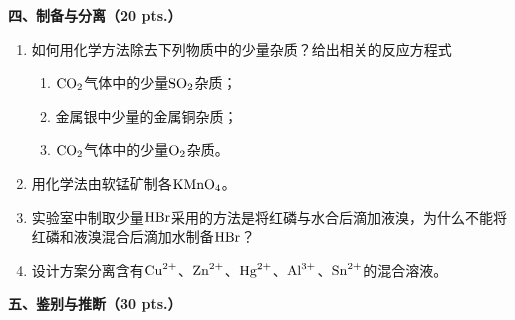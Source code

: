 \vspace{0.5cm}
\noindent\textbf{四、制备与分离（20 pts.）}

\begin{enumerate}[label=\arabic*., start=1, itemsep=1.5ex]
    \item 如何用化学方法除去下列物质中的少量杂质？给出相关的反应方程式
    \begin{enumerate}[label=(\arabic*), itemsep=1ex]
        \item $\ce{CO2}$气体中的少量$\ce{SO2}$杂质；
        \item 金属银中少量的金属铜杂质；
        \item $\ce{CO2}$气体中的少量$\ce{O2}$杂质。
    \end{enumerate}
    \item 用化学法由软锰矿制各$\ce{KMnO4}$。
    \item 实验室中制取少量$\ce{HBr}$采用的方法是将红磷与水合后滴加液溴，为什么不能将红磷和液溴混合后滴加水制备$\ce{HBr}$？
    \item 设计方案分离含有$\ce{Cu^{2+}}$、$\ce{Zn^{2+}}$、$\ce{Hg^{2+}}$、$\ce{Al^3+}$、$\ce{Sn^{2+}}$的混合溶液。
\end{enumerate}

\vspace{0.5cm}
\noindent\textbf{五、鉴别与推断（30 pts.）}

